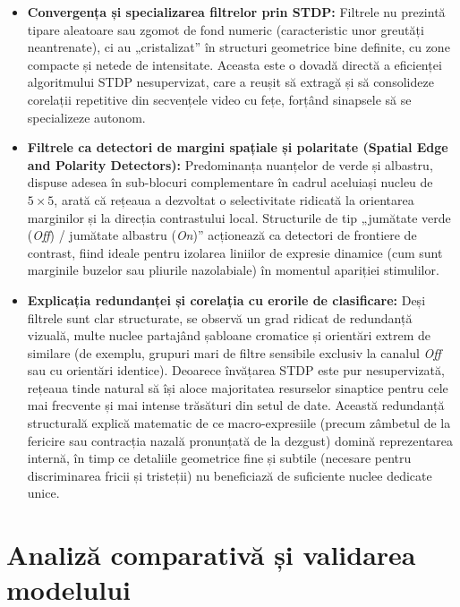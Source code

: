 \begin{itemize}
	
	\item \textbf{Convergența și specializarea filtrelor prin STDP:} Filtrele nu prezintă tipare aleatoare sau zgomot de fond numeric (caracteristic unor greutăți neantrenate), ci au „cristalizat” în structuri geometrice bine definite, cu zone compacte și netede de intensitate. Aceasta este o dovadă directă a eficienței algoritmului STDP nesupervizat, care a reușit să extragă și să consolideze corelații repetitive din secvențele video cu fețe, forțând sinapsele să se specializeze autonom.
	
	\item \textbf{Filtrele ca detectori de margini spațiale și polaritate (Spatial Edge and Polarity Detectors):} Predominanța nuanțelor de verde și albastru, dispuse adesea în sub-blocuri complementare în cadrul aceluiași nucleu de $5 \times 5$, arată că rețeaua a dezvoltat o selectivitate ridicată la orientarea marginilor și la direcția contrastului local. Structurile de tip „jumătate verde (\textit{Off}) / jumătate albastru (\textit{On})” acționează ca detectori de frontiere de contrast, fiind ideale pentru izolarea liniilor de expresie dinamice (cum sunt marginile buzelor sau pliurile nazolabiale) în momentul apariției stimulilor.
	
	\item \textbf{Explicația redundanței și corelația cu erorile de clasificare:} Deși filtrele sunt clar structurate, se observă un grad ridicat de redundanță vizuală, multe nuclee partajând șabloane cromatice și orientări extrem de similare (de exemplu, grupuri mari de filtre sensibile exclusiv la canalul \textit{Off} sau cu orientări identice). Deoarece învățarea STDP este pur nesupervizată, rețeaua tinde natural să își aloce majoritatea resurselor sinaptice pentru cele mai frecvente și mai intense trăsături din setul de date. Această redundanță structurală explică matematic de ce macro-expresiile (precum zâmbetul de la fericire sau contracția nazală pronunțată de la dezgust) domină reprezentarea internă, în timp ce detaliile geometrice fine și subtile (necesare pentru discriminarea fricii și tristeții) nu beneficiază de suficiente nuclee dedicate unice.
	
\end{itemize}

\section{Analiză comparativă și validarea modelului}

